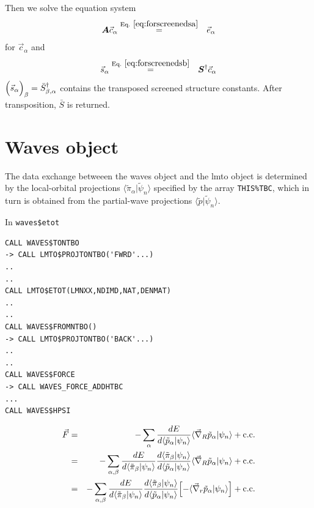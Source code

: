 \documentclass[11pt,a4paper]{report}
\begin{document}
Then we solve the equation system
\begin{eqnarray}
\mat{A}\vec{c}_\alpha
&\eqrel{eq:forscreenedsa}{=}&
\vec{e}_\alpha
\end{eqnarray}
for $\vec{c}_\alpha$ and
\begin{eqnarray}
\vec{s}_\alpha&\eqrel{eq:forscreenedsb}{=}&
\mat{S}^\dagger\vec{c}_\alpha
\end{eqnarray}
$\Bigl(\vec{s}_\alpha\Bigr)_\beta=\bar{S}^\dagger_{\beta,\alpha}$
contains the transposed screened structure constants. After
transposition, $\bar{S}$ is returned.

\section{Waves object}
The data exchange betweeen the waves object and the lmto object is
determined by the local-orbital projections
$\langle\tilde{\pi}_\alpha|\tilde{\psi}_n\rangle$ specified by the
array \verb|THIS%TBC|, which in turn is obtained from the partial-wave
projections $\langle\tilde{p}|\tilde{\psi}_n\rangle$.



In \verb|waves$etot|
\begin{verbatim}
CALL WAVES$TONTBO
-> CALL LMTO$PROJTONTBO('FWRD'...)
..
..
CALL LMTO$ETOT(LMNXX,NDIMD,NAT,DENMAT)
..
..
CALL WAVES$FROMNTBO()
-> CALL LMTO$PROJTONTBO('BACK'...)
..
..
CALL WAVES$FORCE
-> CALL WAVES_FORCE_ADDHTBC
...
CALL WAVES$HPSI
\end{verbatim}


\begin{eqnarray*}
\vec{F}&=&
-\sum_\alpha
\frac{dE}{d\langle\tilde{p}_\alpha|\psi_n\rangle}
\langle\vec{\nabla}_R\tilde{p}_\alpha|\psi_n\rangle
+\mathrm{c.c.}
\nonumber\\
&=&-\sum_{\alpha,\beta}
\frac{dE}{d\langle\tilde{\pi}_\beta|\psi_n\rangle}
\frac{d\langle\tilde{\pi}_\beta|\psi_n\rangle}
{d\langle\tilde{p}_\alpha|\psi_n\rangle}
\langle\vec{\nabla}_R\tilde{p}_\alpha|\psi_n\rangle
+\mathrm{c.c.}
\nonumber\\
&=&-\sum_{\alpha,\beta}
\frac{dE}{d\langle\tilde{\pi}_\beta|\psi_n\rangle}
\frac{d\langle\tilde{\pi}_\beta|\psi_n\rangle}
{d\langle\tilde{p}_\alpha|\psi_n\rangle}
\Bigl[-\langle\vec{\nabla}_r\tilde{p}_\alpha|\psi_n\rangle\Bigr]
+\mathrm{c.c.}
\end{eqnarray*}
\end{document}
